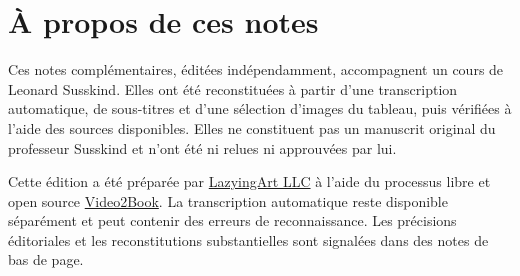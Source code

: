 \documentclass[11pt,oneside]{book}
\begin{document}
\frontmatter
\hypersetup{pageanchor=false}

\hypersetup{pageanchor=true}

\clearpage
\chapter{À propos de ces notes}
Ces notes complémentaires, éditées indépendamment, accompagnent un cours de Leonard Susskind. Elles ont été reconstituées à partir d’une transcription automatique, de sous-titres et d’une sélection d’images du tableau, puis vérifiées à l’aide des sources disponibles. Elles ne constituent pas un manuscrit original du professeur Susskind et n’ont été ni relues ni approuvées par lui.

Cette édition a été préparée par \href{https://lazying.art}{LazyingArt LLC}
à l’aide du processus libre et open source
\href{https://github.com/lachlanchen/Video2Book}{Video2Book}.
La transcription automatique reste disponible séparément et peut contenir des erreurs de reconnaissance. Les précisions éditoriales et les reconstitutions substantielles sont signalées dans des notes de bas de page.
\clearpage
\tableofcontents
\mainmatter
\graphicspath{{../../../generated_course_notes/supplementary/higgs_boson/2012_summer/chapters/lecture_01/}{../../../generated_course_notes/supplementary/higgs_boson/2012_summer/figures/}{../../../generated_course_notes/supplementary/higgs_boson/2012_summer/assets/}}

\end{document}
